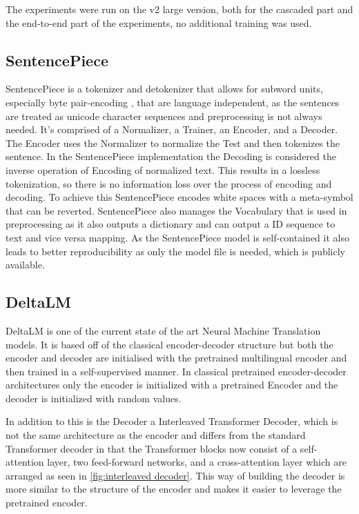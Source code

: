 The experiments were run on the v2 large version, both for the cascaded part and the end-to-end part of the experiments, no additional training was used.

\subsection{SentencePiece}
SentencePiece \cite{kudo-richardson-2018-sentencepiece} is a tokenizer and detokenizer that allows for subword units, especially byte pair-encoding \cite{sennrich-etal-2016-neural}, that are language independent, as the sentences are treated as unicode character sequences and preprocessing is not always needed. 
It's comprised of a Normalizer, a Trainer, an Encoder, and a Decoder. 
The Encoder uses the Normalizer to normalize the Test and then tokenizes the sentence. 
In the SentencePiece implementation the Decoding is considered the inverse operation of Encoding of normalized text. This results in a lossless tokenization, so there is no information loss over the process of encoding and decoding. 
To achieve this SentencePiece encodes white spaces with a meta-symbol that can be reverted. 
SentencePiece also manages the Vocabulary that is used in preprocessing as it also outputs a dictionary and can output a ID sequence to text and vice versa mapping. 
As the SentencePiece model is self-contained it also leads to better reproducibility as only the model file is needed, which is publicly available. 

\subsection{DeltaLM}
DeltaLM \cite{ma2021deltalm} is one of the current state of the art Neural Machine Translation models. 
It is based off of the classical encoder-decoder structure but both the encoder and decoder are initialised with the pretrained multilingual encoder and then trained in a self-supervised manner. In classical pretrained encoder-decoder architectures only the encoder is initialized with a pretrained Encoder and the decoder is initialized with random values.

In addition to this is the Decoder a Interleaved Transformer Decoder, which is not the same architecture as the encoder and differs from the standard Transformer decoder in that the Transformer blocks now consist of a self-attention layer, two feed-forward networks, and a cross-attention layer which are arranged as seen in \autoref{fig:interleaved decoder}. 
This way of building the decoder is more similar to the structure of the encoder and makes it easier to leverage the pretrained encoder. 

